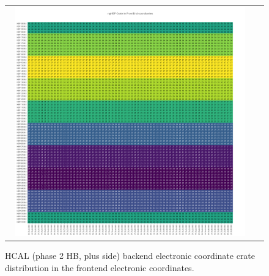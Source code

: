 \begin{figure}[htb]
 \begin{center}
  \begin{tabular}{cc}
   \includegraphics[angle=0,width=0.95\textwidth]{figures/appendix/ngHBP_Crate_in_FrontEnd.png}
  \end{tabular}
  \caption{HCAL (phase 2 HB, plus side) backend electronic coordinate crate distribution in the frontend electronic coordinates.}
  \label{fig:lmapngHBPCrateFEC}
 \end{center}
\end{figure}
\clearpage

